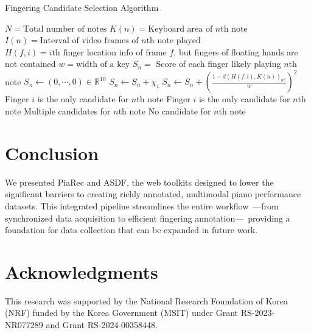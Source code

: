 \documentclass{article}
\begin{document}
\begin{algorithm}[t]
\caption{Fingering Candidate Selection Algorithm}\label{alg:fingeringalgo}
\begin{algorithmic}
\State $N = \text{Total number of notes}$
\State $K(n) = \text{Keyboard area of $n$th note}$
\State $I(n) = \text{Interval of video frames of $n$th note played}$
\State $H(f,i) = i\text{th finger location info of frame $f$,} $ but fingers of floating hands are not contained
\State $w = \text{width of a key}$ 
\State $S_n =$ Score of each finger likely playing $n$th note
\State $S_n \gets (0,\cdots,0)\in \mathbb{R}^{10}$
\State $S_n\gets S_n + \chi_i$ 
\State $S_n \gets S_n + \left(\frac{1-d(H(f,i),K(n))_{\mathbb{R}^2}}{w}\right)^{2}$
\EndIf
\EndFor
\EndFor
{}
\State Finger $i$ is the only candidate for $n$th note
\State Finger $i$ is the only candidate for $n$th note
\Else \text{ }  Multiple candidates for $n$th note
\EndIf
\Else \text{ } No candidate for $n$th note
\EndIf
\EndFor
\end{algorithmic}
\end{algorithm}

\section{Conclusion}
We presented PiaRec and ASDF, the web toolkits designed to lower the significant barriers to creating richly annotated, multimodal piano performance datasets. This integrated pipeline streamlines the entire workflow~---from synchronized data acquisition to efficient fingering annotation---~providing a foundation for data collection that can be expanded in future work.

\section{Acknowledgments}
This research was supported by the National Research Foundation of Korea (NRF) funded by the Korea Government (MSIT) under Grant RS-2023-NR077289 and Grant RS-2024-00358448.


\end{document}
